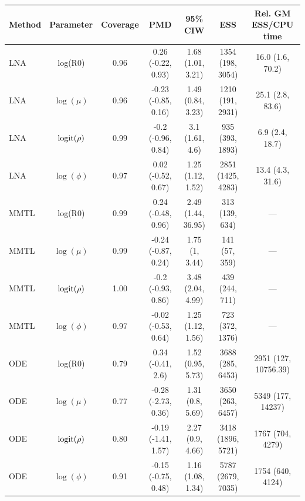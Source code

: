 \begin{table}
\begin{fullpage}
	\end{fullpage}
\end{table}

\begin{table}
	\begin{fullpage}
		\small
		\centering
		\begin{tabular}{lcccccc}
			\hline
			\textbf{Method} & \textbf{Parameter} & \textbf{Coverage} & \textbf{PMD} & \textbf{95\% CIW} & \textbf{ESS} & \textbf{Rel. GM ESS/CPU time} \\ 
			\hline
			LNA & log(R0) & 0.96 & 0.26 (-0.22, 0.93) & 1.68 (1.01, 3.21) & 1354 (198, 3054) & 16.0 (1.6, 70.2) \\ 
			LNA & $\log(\mu)$ & 0.96 & -0.23 (-0.85, 0.16) & 1.49 (0.84, 3.23) & 1210 (191, 2931) & 25.1 (2.8, 83.6) \\ 
			LNA & $\mathrm{logit}(\rho)$ & 0.99 & -0.2 (-0.96, 0.84) & 3.1 (1.61, 4.6) & 935 (393, 1893) & 6.9 (2.4, 18.7) \\ 
			LNA & $\log(\phi)$ & 0.97 & 0.02 (-0.52, 0.67) & 1.25 (1.12, 1.52) & 2851 (1425, 4283) & 13.4 (4.3, 31.6) \\ 
			MMTL & log(R0) & 0.99 & 0.24 (-0.48, 0.96) & 2.49 (1.44, 36.95) & 313 (139, 634) & --- \\ 
			MMTL & $\log(\mu)$ & 0.99 & -0.24 (-0.87, 0.24) & 1.75 (1, 3.44) & 141 (57, 359) & --- \\ 
			MMTL & $\mathrm{logit}(\rho)$ & 1.00 & -0.2 (-0.93, 0.86) & 3.48 (2.04, 4.99) & 439 (244, 711) & --- \\ 
			MMTL & $\log(\phi)$ & 0.97 & -0.02 (-0.53, 0.64) & 1.25 (1.12, 1.56) & 723 (372, 1376) & --- \\ 
			ODE & log(R0) & 0.79 & 0.34 (-0.41, 2.6) & 1.52 (0.95, 5.73) & 3688 (285, 6453) & 2951 (127, 10756.39) \\ 
			ODE & $\log(\mu)$ & 0.77 & -0.28 (-2.73, 0.36) & 1.31 (0.8, 5.69) & 3650 (263, 6457) & 5349 (177, 14237) \\ 
			ODE & $\mathrm{logit}(\rho)$ & 0.80 & -0.19 (-1.41, 1.57) & 2.27 (0.9, 4.66) & 3418 (1896, 5721) & 1767 (704, 4279) \\ 
			ODE & $\log(\phi)$ & 0.91 & -0.15 (-0.75, 0.48) & 1.16 (1.08, 1.34) & 5787 (2679, 7035) & 1754 (640, 4124) \\ 
			\hline
		\end{tabular}

\end{fullpage}
\end{table}
